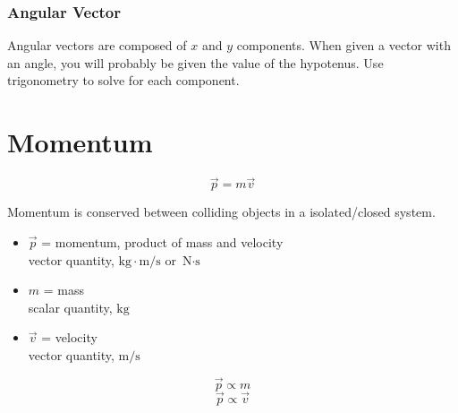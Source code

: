 \documentclass[a4paper,12pt]{article}
\begin{document}
\subsubsection{Angular Vector}
Angular vectors are composed of $x$ and $y$ components.
When given a vector with an angle, you will probably be given the value of the hypotenus.
Use trigonometry to solve for each component.

\pagebreak

\section{Momentum}
\Large $$\vec{p} = m\vec{v}$$ \normalsize

Momentum is conserved between colliding objects in a isolated/closed system.

\begin{itemize}
    \item{$\vec{p}$ = momentum, product of mass and velocity\\vector quantity, $\si{\kg\cdot\m/\s}$ or $\si{\N\cdot\s}$}
    \item{$m$ = mass\\scalar quantity, $\si{\kg}$}
    \item{$\vec{v}$ = velocity\\vector quantity, $\si{\m/\s}$}
\end{itemize}
\Large
$$\vec{p} \propto m$$
$$\vec{p} \propto \vec{v}$$
\normalsize
\end{document}
